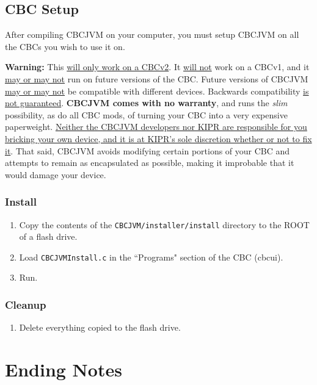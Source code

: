 \documentclass[12pt,letterpaper]{article}
\begin{document}
\subsection{CBC Setup}

After compiling CBCJVM on your computer, you must setup CBCJVM on all the CBCs you wish to use it on.

\textbf{Warning:} This \uline{will only work on a CBCv2}. It \uline{will not} work on a CBCv1, and it \uline{may or may not} run on future versions of the CBC. Future versions of CBCJVM \uline{may or may not} be compatible with different devices. Backwards compatibility \uline{is not guaranteed}. \textbf{CBCJVM comes with no warranty}, and runs the \emph{slim} possibility, as do all CBC mods, of turning your CBC into a very expensive paperweight. \uline{Neither the CBCJVM developers nor KIPR are responsible for you bricking your own device, and it is at KIPR's sole discretion whether or not to fix it}. That said, CBCJVM avoids modifying certain portions of your CBC and attempts to remain as encapsulated as possible, making it improbable that it would damage your device.



\subsubsection{Install}

\begin{enumerate}
\item Copy the contents of the \texttt{CBCJVM/installer/install} directory to the ROOT of a flash drive.
\item Load \texttt{CBCJVMInstall.c} in the ``Programs" section of the CBC (cbcui).
\item Run.
\end{enumerate}



\subsubsection{Cleanup}

\begin{enumerate}
\item Delete everything copied to the flash drive.
\end{enumerate}


\pagebreak
\section{Ending Notes}
\end{document}
